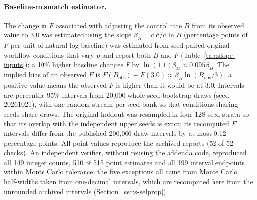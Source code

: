 \paragraph{Baseline-mismatch estimator.} The change in $F$ associated with adjusting
the control rate $B$ from its observed value to 3.0 was estimated using the slope
$\beta_B=\mathrm dF/\mathrm d\ln B$ (percentage points of $F$ per unit of
natural-log baseline) was estimated from seed-paired original-workflow
conditions that vary $p$ and report both $B$ and $F$
(Table~\ref{tab:slope-inputs}); a 10\% higher baseline changes $F$ by
$\ln(1.1)\beta_B\approx0.095\beta_B$. The implied bias of an observed $F$ is
$F(B_{\mathrm{obs}})-F(3.0)\approx\beta_B\ln(B_{\mathrm{obs}}/3)$; a positive
value means the observed $F$ is higher than it would be at 3.0. Intervals are
percentile 95\% intervals from 20,000 whole-seed bootstrap draws (seed 20261021),
with one random stream per seed bank so that conditions sharing seeds share
draws. The original holdout was resampled in four 128-seed strata so that its
overlap with the independent upper seeds is exact; its recomputed $F$ intervals
differ from the published 200,000-draw intervals by at most 0.12 percentage
points. All point values reproduce the archived reports (52 of 52 checks). An
independent verifier, without reusing the addenda code, reproduced all 149 integer
counts, 510 of 515 point estimates and all 199 interval endpoints within Monte
Carlo tolerance; the five exceptions all came from Monte Carlo half-widths taken
from one-decimal intervals, which are recomputed here from the unrounded archived
intervals (Section~\ref{sec:s-selprop}).

